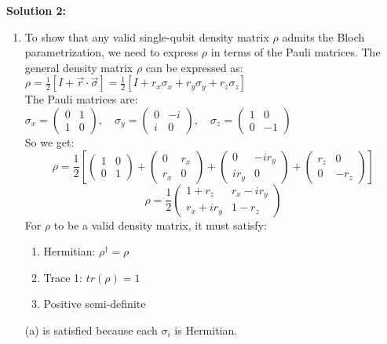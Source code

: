\documentclass{article}
\begin{document}
\textbf{Solution 2:}
\begin{enumerate}
    \item[a)] To show that any valid single-qubit density matrix $\rho$ admits the Bloch parametrization, we need to express $\rho$ in terms of the Pauli matrices. The general density matrix $\rho$ can be expressed as:$\rho = \frac{1}{2} \left[ I + \vec{r} \cdot \vec{\sigma} \right] = \frac{1}{2} \left[ I + r_x \sigma_x + r_y \sigma_y + r_z \sigma_z \right]$\\
    The Pauli matrices are: $\sigma_x = \begin{pmatrix} 0 & 1 \\ 1 & 0 \end{pmatrix}, \quad \sigma_y = \begin{pmatrix} 0 & -i \\ i & 0 \end{pmatrix}, \quad \sigma_z = \begin{pmatrix} 1 & 0 \\ 0 & -1 \end{pmatrix}$\\
    So we get: $$\rho=\frac{1}{2}\left[\begin{pmatrix} 1 & 0 \\ 0  & 1
    \end{pmatrix} + \begin{pmatrix}
    0  & r_x \\ r_x & 0
    \end{pmatrix} + \begin{pmatrix}
    0 & -ir_y \\ ir_y & 0
    \end{pmatrix} + \begin{pmatrix}
    r_z & 0 \\0 & -r_z
    \end{pmatrix}\right]$$
    $$\rho = \frac{1}{2} \begin{pmatrix} 1 + r_z & r_x - i r_y \\ r_x + i r_y & 1 - r_z \end{pmatrix}$$
    For $\rho$ to be a valid density matrix, it must satisfy:
    \begin{enumerate}
        \item Hermitian: $\rho^\dagger=\rho$
        \item Trace 1: $tr(\rho)=1$
        \item Positive semi-definite
    \end{enumerate}
    (a) is satisfied because each $\sigma_i$ is Hermitian.

\end{enumerate}
\end{document}
